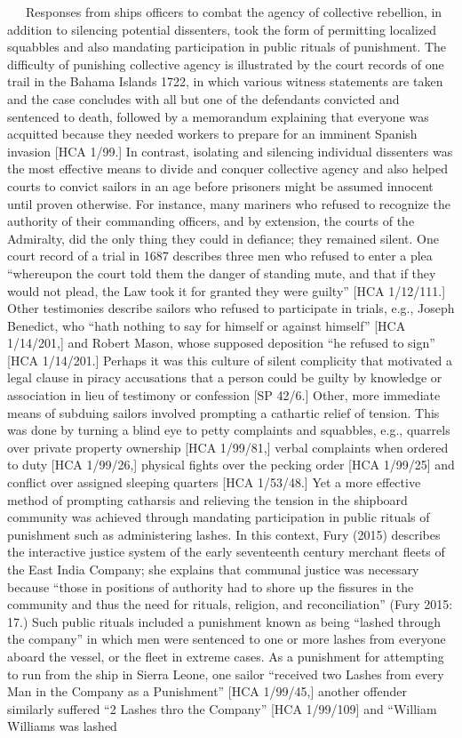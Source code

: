 \begin{styleStandard}
\ \ \ Responses from ships officers to combat the agency of collective rebellion, in addition to silencing potential dissenters, took the form of permitting localized squabbles and also mandating participation in public rituals of punishment. The difficulty of punishing collective agency is illustrated by the court records of one trail in the Bahama Islands 1722, in which various witness statements are taken and the case concludes with all but one of the defendants convicted and sentenced to death, followed by a memorandum explaining that everyone was acquitted because they needed workers to prepare for an imminent Spanish invasion [HCA 1/99.] In contrast, isolating and silencing individual dissenters was the most effective means to divide and conquer collective agency and also helped courts to convict sailors in an age before prisoners might be assumed innocent until proven otherwise. For instance, many mariners who refused to recognize the authority of their commanding officers, and by extension, the courts of the Admiralty, did the only thing they could in defiance; they remained silent. One court record of a trial in 1687 describes three men who refused to enter a plea “whereupon the court told them the danger of standing mute, and that if they would not plead, the Law took it for granted they were guilty” [HCA 1/12/111.] Other testimonies describe sailors who refused to participate in trials, e.g., Joseph Benedict, who “hath nothing to say for himself or against himself” [HCA 1/14/201,] and Robert Mason, whose supposed deposition “he refused to sign” [HCA 1/14/201.] Perhaps it was this culture of silent complicity that motivated a legal clause in piracy accusations that a person could be guilty by knowledge or association in lieu of testimony or confession [SP 42/6.] Other, more immediate means of subduing sailors involved prompting a cathartic relief of tension. This was done by turning a blind eye to petty complaints and squabbles, e.g., quarrels over private property ownership [HCA 1/99/81,] verbal complaints when ordered to duty [HCA 1/99/26,] physical fights over the pecking order [HCA 1/99/25] and conflict over assigned sleeping quarters [HCA 1/53/48.] Yet a more effective method of prompting catharsis and relieving the tension in the shipboard community was achieved through mandating participation in public rituals of punishment such as administering lashes. In this context, Fury (2015) describes the interactive justice system of the early seventeenth century merchant fleets of the East India Company; she explains that communal justice was necessary because “those in positions of authority had to shore up the fissures in the community and thus the need for rituals, religion, and reconciliation” (Fury 2015: 17.) Such public rituals included a punishment known as being “lashed through the company” in which men were sentenced to one or more lashes from everyone aboard the vessel, or the fleet in extreme cases. As a punishment for attempting to run from the ship in Sierra Leone, one sailor “received two Lashes from every Man in the Company as a Punishment” [HCA 1/99/45,] another offender similarly suffered “2 Lashes thro the Company” [HCA 1/99/109] and “William Williams was lashed 
\end{styleStandard}
